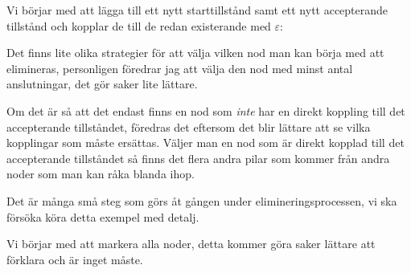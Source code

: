 \par\noindent Vi börjar med att lägga till ett nytt starttillstånd samt ett nytt accepterande tillstånd och kopplar de till de redan existerande med $\varepsilon$:
\begin{figure}[ht!]
    \centering
    \caption{}
\end{figure}
\par\bigskip
\noindent Det finns lite olika strategier för att välja vilken nod man kan börja med att elimineras, personligen föredrar jag att välja den nod med minst antal anslutningar, det gör saker lite lättare.\par
\noindent Om det är så att det endast finns en nod som \textit{inte} har en direkt koppling till det accepterande tillståndet, föredras det eftersom det blir lättare att se vilka kopplingar som måste ersättas. Väljer man en nod som är direkt kopplad till det accepterande tillståndet så finns det flera andra pilar som kommer från andra noder som man kan råka blanda ihop.
\par\bigskip
\noindent Det är många små steg som görs åt gången under elimineringsprocessen, vi ska försöka köra detta exempel med detalj.
\par\bigskip
\noindent Vi börjar med att markera alla noder, detta kommer göra saker lättare att förklara och är inget måste.
\newpage
